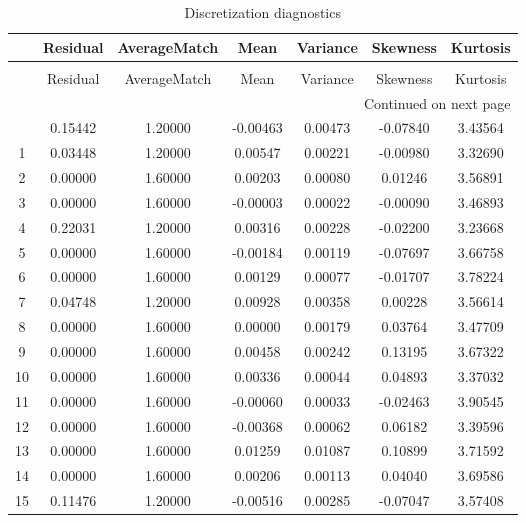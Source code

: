 \begin{longtable}{c c c c c c c}
\caption{Discretization diagnostics}
\label{tab:discret_diagn}\\
\toprule
{} & Residual & AverageMatch &     Mean &  Variance &  Skewness &  Kurtosis \\
\midrule
\endfirsthead
\caption[]{Discretization diagnostics} \\
\toprule
{} & Residual & AverageMatch &     Mean &  Variance &  Skewness &  Kurtosis \\
\midrule
\endhead
\midrule
\multicolumn{7}{r}{{Continued on next page}} \\
\midrule
\endfoot

\bottomrule
\endlastfoot
0   &  0.15442 &      1.20000 & -0.00463 &   0.00473 &  -0.07840 &   3.43564 \\
1   &  0.03448 &      1.20000 &  0.00547 &   0.00221 &  -0.00980 &   3.32690 \\
2   &  0.00000 &      1.60000 &  0.00203 &   0.00080 &   0.01246 &   3.56891 \\
3   &  0.00000 &      1.60000 & -0.00003 &   0.00022 &  -0.00090 &   3.46893 \\
4   &  0.22031 &      1.20000 &  0.00316 &   0.00228 &  -0.02200 &   3.23668 \\
5   &  0.00000 &      1.60000 & -0.00184 &   0.00119 &  -0.07697 &   3.66758 \\
6   &  0.00000 &      1.60000 &  0.00129 &   0.00077 &  -0.01707 &   3.78224 \\
7   &  0.04748 &      1.20000 &  0.00928 &   0.00358 &   0.00228 &   3.56614 \\
8   &  0.00000 &      1.60000 &  0.00000 &   0.00179 &   0.03764 &   3.47709 \\
9   &  0.00000 &      1.60000 &  0.00458 &   0.00242 &   0.13195 &   3.67322 \\
10  &  0.00000 &      1.60000 &  0.00336 &   0.00044 &   0.04893 &   3.37032 \\
11  &  0.00000 &      1.60000 & -0.00060 &   0.00033 &  -0.02463 &   3.90545 \\
12  &  0.00000 &      1.60000 & -0.00368 &   0.00062 &   0.06182 &   3.39596 \\
13  &  0.00000 &      1.60000 &  0.01259 &   0.01087 &   0.10899 &   3.71592 \\
14  &  0.00000 &      1.60000 &  0.00206 &   0.00113 &   0.04040 &   3.69586 \\
15  &  0.11476 &      1.20000 & -0.00516 &   0.00285 &  -0.07047 &   3.57408 \\

\end{longtable}
